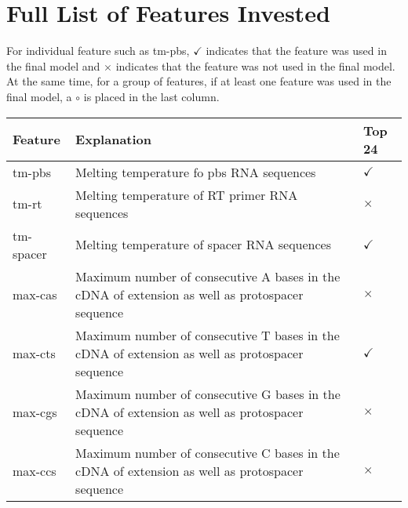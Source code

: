 \chapter{Full List of Features Invested}
\label{appendix:features}

For individual feature such as tm-pbs, $\checkmark$ indicates that the feature was used in the final model and $\times$ indicates that the feature was not used in the final model. At the same time, for a group of features, if at least one feature was used in the final model, a $\circ$ is placed in the last column. 

\begin{table}[ht]
    \centering
    \begin{tabular}{|p{}|p{}|p{}|}
        \hline
        \textbf{Feature} & \textbf{Explanation} & \textbf{Top 24} \\ 
        \hline
        tm-pbs& Melting temperature fo pbs RNA sequences & $\checkmark$ \\
        \hline
        tm-rt& Melting temperature of RT primer RNA sequences & $\times$ \\
        \hline
        tm-spacer& Melting temperature of spacer RNA sequences & $\checkmark$ \\
        \hline
        max-cas & Maximum number of consecutive A bases in the cDNA of extension as well as protospacer sequence & $\times$ \\
        \hline
        max-cts & Maximum number of consecutive T bases in the cDNA of extension as well as protospacer sequence & $\checkmark$ \\
        \hline
        max-cgs & Maximum number of consecutive G bases in the cDNA of extension as well as protospacer sequence & $\times$ \\
        \hline
        max-ccs & Maximum number of consecutive C bases in the cDNA of extension as well as protospacer sequence & $\times$ \\
        \hline
    \end{tabular}
\end{table}